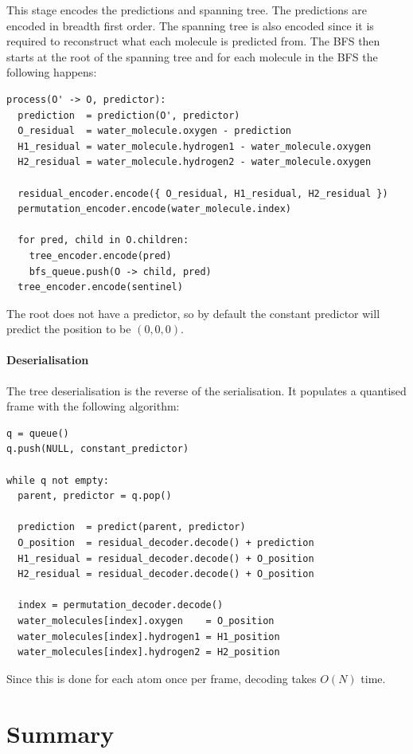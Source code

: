 \documentclass[a4paper]{report}
\begin{document}
This stage encodes the predictions and spanning tree. The predictions are
encoded in breadth first order. The spanning tree is also encoded since it is
required to reconstruct what each molecule is predicted from. The BFS then
starts at the root of the spanning tree and for each molecule in the BFS the
following happens:

\begin{verbatim}
process(O' -> O, predictor):
  prediction  = prediction(O', predictor)
  O_residual  = water_molecule.oxygen - prediction
  H1_residual = water_molecule.hydrogen1 - water_molecule.oxygen
  H2_residual = water_molecule.hydrogen2 - water_molecule.oxygen

  residual_encoder.encode({ O_residual, H1_residual, H2_residual })
  permutation_encoder.encode(water_molecule.index)

  for pred, child in O.children:
    tree_encoder.encode(pred)
    bfs_queue.push(O -> child, pred)
  tree_encoder.encode(sentinel)
\end{verbatim}

The root does not have a predictor, so by default the constant predictor will
predict the position to be $(0,0,0)$.


\paragraph{Deserialisation}

The tree deserialisation is the reverse of the serialisation. It populates a
quantised frame with the following algorithm:

\begin{verbatim}
q = queue()
q.push(NULL, constant_predictor)

while q not empty:
  parent, predictor = q.pop()

  prediction  = predict(parent, predictor)
  O_position  = residual_decoder.decode() + prediction
  H1_residual = residual_decoder.decode() + O_position
  H2_residual = residual_decoder.decode() + O_position

  index = permutation_decoder.decode()
  water_molecules[index].oxygen    = O_position
  water_molecules[index].hydrogen1 = H1_position
  water_molecules[index].hydrogen2 = H2_position
\end{verbatim}

Since this is done for each atom once per frame, decoding takes $O(N)$ time.


\section{Summary}
\end{document}
